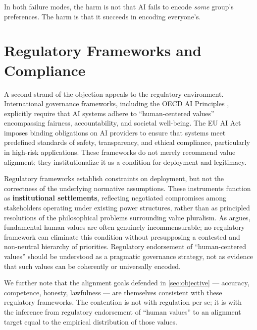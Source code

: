 \documentclass{article}
\theoremstyle{plain}
\theoremstyle{definition}
\theoremstyle{remark}
\begin{document}
In both failure modes, the harm is not that AI fails to encode \emph{some} group's preferences. The harm is that it succeeds in encoding everyone's.

\section{Regulatory Frameworks and Compliance}
\label{sec:alt-regulatory}
A second strand of the objection appeals to the regulatory environment. International governance frameworks, including the OECD AI Principles \citep{oecd2019ai}, explicitly require that AI systems adhere to ``human-centered values'' encompassing fairness, accountability, and societal well-being. The EU AI Act \citep{eu2024aiact} imposes binding obligations on AI providers to ensure that systems meet predefined standards of safety, transparency, and ethical compliance, particularly in high-risk applications. These frameworks do not merely recommend value alignment; they institutionalize it as a condition for deployment and legitimacy.

Regulatory frameworks establish constraints on deployment, but not the correctness of the underlying normative assumptions. These instruments function as \textbf{institutional settlements}, reflecting negotiated compromises among stakeholders operating under existing power structures, rather than as principled resolutions of the philosophical problems surrounding value pluralism. As \citet{berlin1990crooked} argues, fundamental human values are often genuinely incommensurable; no regulatory framework can eliminate this condition without presupposing a contested and non-neutral hierarchy of priorities. Regulatory endorsement of ``human-centered values'' should be understood as a pragmatic governance strategy, not as evidence that such values can be coherently or universally encoded.

We further note that the alignment goals defended in \cref{sec:objective} --- accuracy, competence, honesty, lawfulness --- are themselves consistent with these regulatory frameworks. The contention is not with regulation per se; it is with the inference from regulatory endorsement of ``human values'' to an alignment target equal to the empirical distribution of those values.
\end{document}
